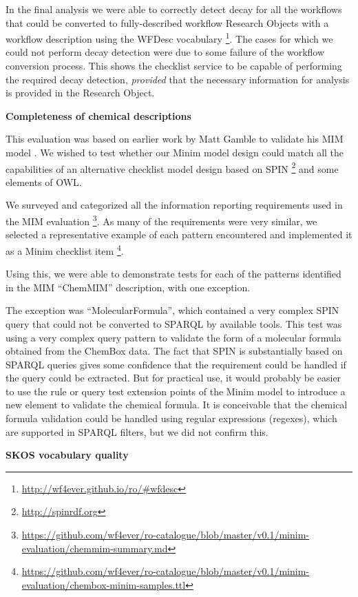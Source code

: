 In the final analysis we were able to correctly detect decay for all the
workflows that could be converted to fully-described workflow Research
Objects with a workflow description using the WFDesc vocabulary
\footnote{\url{http://wf4ever.github.io/ro/\#wfdesc}}. The cases for
which we could not perform decay detection were due to some failure of
the workflow conversion process. This shows the checklist service to be
capable of performing the required decay detection, \emph{provided} that
the necessary information for analysis is provided in the Research
Object.

\textbf{Completeness of chemical descriptions}

This evaluation was based on earlier work by Matt Gamble to validate his
MIM model \cite{Gamble-2011}. We wished to test whether our Minim model
design could match all the capabilities of an alternative checklist
model design based on SPIN \footnote{\url{http://spinrdf.org}} and some
elements of OWL.

We surveyed and categorized all the information reporting requirements
used in the MIM evaluation \footnote{\url{https://github.com/wf4ever/ro-catalogue/blob/master/v0.1/minim-evaluation/chemmim-summary.md}}.
As many of the requirements were very similar, we selected a
representative example of each pattern encountered and implemented it as
a Minim checklist item \footnote{\url{https://github.com/wf4ever/ro-catalogue/blob/master/v0.1/minim-evaluation/chembox-minim-samples.ttl}}.

Using this, we were able to demonstrate tests for each of the patterns
identified in the MIM ``ChemMIM'' description, with one exception.

The exception was ``MolecularFormula'', which contained a very complex
SPIN query that could not be converted to SPARQL by available tools.
This test was using a very complex query pattern to validate the form of
a molecular formula obtained from the ChemBox data. The fact that SPIN
is substantially based on SPARQL queries gives some confidence that the
requirement could be handled if the query could be extracted. But for
practical use, it would probably be easier to use the rule or query test
extension points of the Minim model to introduce a new element to
validate the chemical formula. It is conceivable that the chemical
formula validation could be handled using regular expressions (regexes),
which are supported in SPARQL filters, but we did not confirm this.

\textbf{SKOS vocabulary quality}

